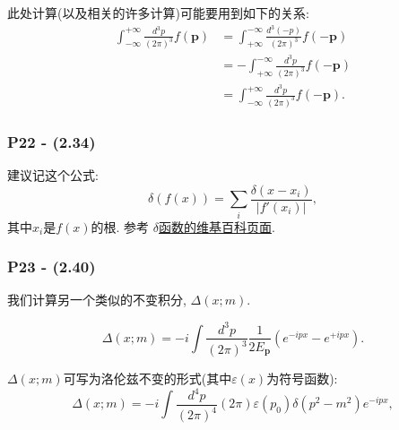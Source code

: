 \documentclass[cn,hazy,green,11pt,device=normal,chinesefont=founder]{elegantnote}
\begin{document}
此处计算(以及相关的许多计算)可能要用到如下的关系: 
\begin{equation}
  \begin{aligned}
  \int_{-\infty}^{+\infty}\frac{d^3 p}{(2\pi)^3}f(\mathbf p) &= \int_{+\infty}^{-\infty}\frac{d^3 (-p)}{(2\pi)^3}f(-\mathbf p) \\
  &= -\int_{+\infty}^{-\infty}\frac{d^3 p}{(2\pi)^3}f(-\mathbf p) \\
  &= \int_{-\infty}^{+\infty}\frac{d^3 p}{(2\pi)^3}f(-\mathbf p).
  \end{aligned}
\end{equation}

\subsubsection{P22 - (2.34)}

建议记这个公式: 
\begin{equation}\label{eq: delta_on_function}
  \delta(f(x)) = \sum_i \frac{\delta(x-x_i)}{|f'(x_i)|}, 
\end{equation}
其中$x_i$是$f(x)$的根. 参考 \href{https://zh.wikipedia.org/wiki/狄拉克δ函数#與函數的復合}{$\delta$函数的维基百科页面}. 

\subsubsection{P23 - (2.40)} \label{subsubsec: Invar_Delta}

我们计算另一个类似的不变积分, $\Delta(x; m)$. 

\begin{definition}
  \begin{equation}
    \Delta(x; m) = -i\int\frac{d^3 p}{(2\pi)^3} \frac{1}{2E_\mathbf{p}}(e^{-ipx} - e^{+ipx}). 
  \end{equation}
\end{definition}

$\Delta(x; m)$可写为洛伦兹不变的形式(其中$\varepsilon(x)$为符号函数): 
\begin{equation}
  \Delta(x; m) = -i\int \frac{d^4 p}{(2\pi)^4}(2\pi)\varepsilon(p_0) \delta(p^2 - m^2)e^{-ipx}, 
\end{equation}
\end{document}
